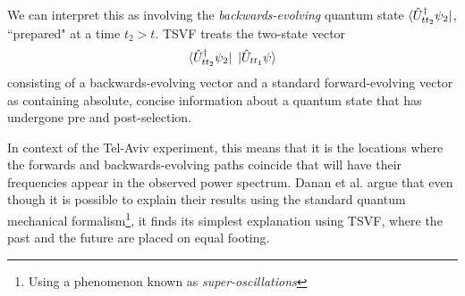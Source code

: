 \documentclass{article}
\begin{document}
We can interpret this as involving the \textit{backwards-evolving} quantum 
state $\bra{\hat U_{t t_2}^{\dagger}\psi_2}$, ``prepared" at a time $t_2 > t$.  
TSVF treats the two-state vector $$\bra{\hat U_{t t_2}^{\dagger}\psi_2} 
~\ket{\hat U_{t t_1}\psi}$$ consisting of a backwards-evolving vector and a 
standard forward-evolving vector as containing absolute, concise information 
about a quantum state that has undergone pre and 
post-selection\cite{aharonov2008,danan}.

In context of the Tel-Aviv experiment, this means that it is the locations 
where the forwards and backwards-evolving paths coincide that will have their 
frequencies appear in the observed power spectrum\cite{danan}. Danan et al.  
argue that even though it is possible to explain their results using the 
standard quantum mechanical formalism\footnote{Using a phenomenon known as 
\textit{super-oscillations}}, it finds its simplest explanation using TSVF, 
where the past and the future are placed on equal footing.  


\nocite{*}
\end{document}
